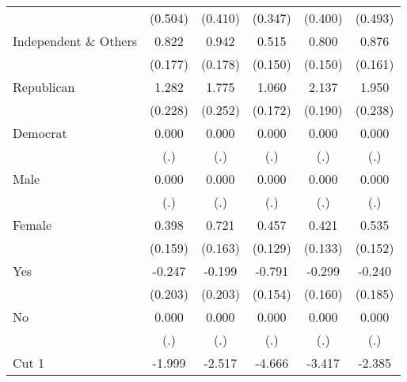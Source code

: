 \begin{table}[htbp]
\begin{tabular}{l*{5}{c}}
                    &     (0.504)         &     (0.410)         &     (0.347)         &     (0.400)         &     (0.493)         \\
Independent \& Others&       0.822\sym{***}&       0.942\sym{***}&       0.515\sym{***}&       0.800\sym{***}&       0.876\sym{***}\\
                    &     (0.177)         &     (0.178)         &     (0.150)         &     (0.150)         &     (0.161)         \\
Republican          &       1.282\sym{***}&       1.775\sym{***}&       1.060\sym{***}&       2.137\sym{***}&       1.950\sym{***}\\
                    &     (0.228)         &     (0.252)         &     (0.172)         &     (0.190)         &     (0.238)         \\
Democrat            &       0.000         &       0.000         &       0.000         &       0.000         &       0.000         \\
                    &         (.)         &         (.)         &         (.)         &         (.)         &         (.)         \\
Male                &       0.000         &       0.000         &       0.000         &       0.000         &       0.000         \\
                    &         (.)         &         (.)         &         (.)         &         (.)         &         (.)         \\
Female              &       0.398\sym{**} &       0.721\sym{***}&       0.457\sym{***}&       0.421\sym{***}&       0.535\sym{***}\\
                    &     (0.159)         &     (0.163)         &     (0.129)         &     (0.133)         &     (0.152)         \\
Yes                 &      -0.247         &      -0.199         &      -0.791\sym{***}&      -0.299\sym{*}  &      -0.240         \\
                    &     (0.203)         &     (0.203)         &     (0.154)         &     (0.160)         &     (0.185)         \\
No                  &       0.000         &       0.000         &       0.000         &       0.000         &       0.000         \\
                    &         (.)         &         (.)         &         (.)         &         (.)         &         (.)         \\
Cut 1               &      -1.999\sym{**} &      -2.517\sym{***}&      -4.666\sym{***}&      -3.417\sym{***}&      -2.385\sym{***}\\

\end{tabular}
\end{table}
